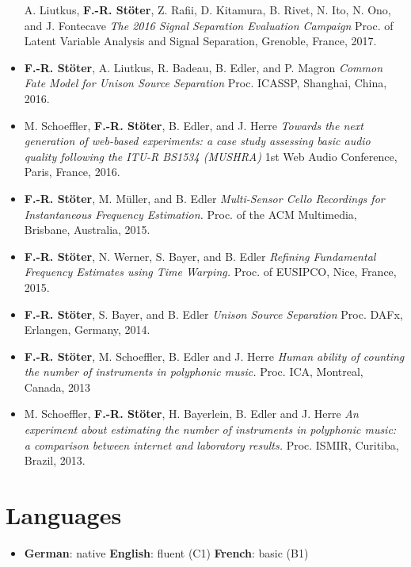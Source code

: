 \documentclass[a4paper,11pt]{article}
\newcommand{\resumeSubHeadingListStart}{\begin{itemize}[leftmargin=*]}
\newcommand{\resumeSubHeadingListEnd}{\end{itemize}}
\begin{document}
\begin{itemize}
  A. Liutkus, \textbf{F.-R. Stöter}, Z. Rafii, D. Kitamura, B. Rivet, N.
  Ito, N. Ono, and J. Fontecave \emph{The 2016 Signal Separation Evaluation
  Campaign} Proc. of Latent Variable Analysis and Signal Separation, Grenoble, France, 2017.
\item
  \textbf{F.-R. Stöter}, A. Liutkus, R. Badeau, B. Edler, and P. Magron
  \emph{Common Fate Model for Unison Source Separation} Proc. ICASSP, 
  Shanghai, China, 2016.
\item
  M. Schoeffler, \textbf{F.-R. Stöter}, B. Edler, and J. Herre \emph{Towards
  the next generation of web-based experiments: a case study assessing
  basic audio quality following the ITU-R BS1534
  (MUSHRA)} 1st Web Audio Conference, Paris, France, 2016.
\item
  \textbf{F.-R. Stöter}, M. Müller, and B. Edler
  \emph{Multi-Sensor Cello Recordings for Instantaneous Frequency
  Estimation.} Proc. of the ACM Multimedia, Brisbane, Australia, 2015.
\item
  \textbf{F.-R. Stöter}, N. Werner, S. Bayer, and B. Edler \emph{Refining
  Fundamental Frequency Estimates using Time Warping.} Proc. of
  EUSIPCO, Nice, France, 2015.
\item
  \textbf{F.-R. Stöter}, S. Bayer, and B. Edler \emph{Unison Source
  Separation} Proc. DAFx, Erlangen, Germany, 2014.
\item
  \textbf{F.-R. Stöter}, M. Schoeffler, B. Edler and J. Herre \emph{Human
  ability of counting the number of instruments in polyphonic music.}
  Proc. ICA, Montreal, Canada, 2013
\item
  M. Schoeffler, \textbf{F.-R. Stöter}, H. Bayerlein, B. Edler and J. Herre
  \emph{An experiment about estimating the number of instruments in
  polyphonic music: a comparison between internet and laboratory
  results.} Proc. ISMIR, Curitiba, Brazil, 2013.
\end{itemize}

\section{Languages}
\resumeSubHeadingListStart
  \item{
    \textbf{German}{: native}
    \textbf{English}{: fluent (C1)}
    \textbf{French}{: basic (B1)}
  }
\resumeSubHeadingListEnd
\end{document}
